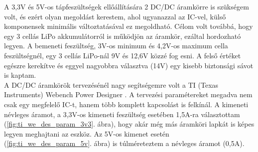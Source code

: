 \documentclass[../main.tex]{subfiles}
\begin{document}
            A 3,3V és 5V-os tápfeszültségek ellőállítására 2 DC/DC áramkörre is szükségem volt, és ezért olyan megoldást kerestem, ahol ugyanazzal az IC-vel, külső komponensek minimális változtatásával ez megoldható. Célom volt továbbá, hogy egy 3 cellás LiPo akkumulátorról is működjön az áramkör, ezáltal hordozható legyen. A bemeneti feszültség, 3V-os minimum és 4,2V-os maximum cella feszültségnél, egy 3 cellás LiPo-nál 9V és 12,6V közzé fog esni. A felső értéket egészre kerekítve és eggyel nagyobbra választva (14V) egy kisebb biztonsági sávot is kaptam.
            \\
            A DC/DC áramkörök tervezésénél nagy segítségemre volt a TI (Texas Instruments) Webench Power Designer \cite{ti_webench}.
            A tervezési paramétereket megadva nem csak egy megfelelő IC-t, hanem több komplett kapcsolást is felkínál. A kimeneti névleges áramot, a 3,3V-os kimeneti feszültség esetében 1,5A-ra választottam (\ref{fig:ti_we_des_param_3v3}. ábra), hogy akár még más áramköri lapkát is képes legyen meghajtani az eszköz. Az 5V-os kimenet esetén (\ref{fig:ti_we_des_param_5v}. ábra) is túlméreteztem a névleges áramot (0,5A).
            
            \begin{figure}[h!] %
                \begin{floatrow}
                \end{floatrow}
            \end{figure}
            
\end{document}
